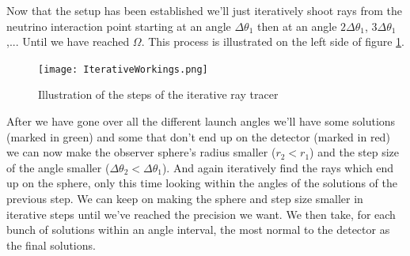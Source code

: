 Now that the setup has been established we'll just iteratively shoot rays from the neutrino
interaction point starting at an angle $\Delta \theta_1$ then at an angle
$2\Delta \theta_1$, $3\Delta \theta_1$,... Until we have reached $\Omega$. This
process is illustrated on the left side of figure \ref{fig:IterativeWorkings}.
\begin{figure}
  \centering
  \texttt{[image: IterativeWorkings.png]}
  \caption{Illustration of the steps of the iterative ray tracer}
  \label{fig:IterativeWorkings}
\end{figure}
After we have gone over all the different launch angles we'll have some
solutions (marked in green) and some that don't end up on the detector (marked
in red) we can now make the observer sphere's radius smaller ($r_2 < r_1$) and
the step size of the angle smaller ($\Delta \theta_2 < \Delta \theta_1$).  And
again iteratively find the rays which end up on the sphere, only this time
looking within the angles of the solutions of the previous step. We can keep on
making the sphere and step size smaller in iterative steps until we've reached
the precision we want. We then take, for each bunch of solutions within an
angle interval, the most normal to the detector as the final solutions.




